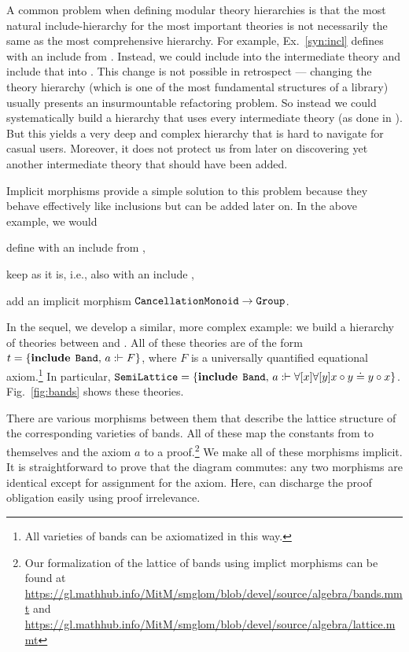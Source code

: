 A common problem when defining modular theory hierarchies is that the most natural include-hierarchy for the most important theories is not necessarily the same as the most comprehensive hierarchy.
For example, Ex.~\ref{syn:incl} defines  with an include from .
Instead, we could include  into the intermediate theory  and include that into .
This change is not possible in retrospect --- changing the theory hierarchy (which is one of the most fundamental structures of a library) usually presents an insurmountable refactoring problem.
So instead we could systematically build a hierarchy that uses every intermediate theory (as done in \cite{mathscheme}).
But this yields a very deep and complex hierarchy that is hard to navigate for casual users.
Moreover, it does not protect us from later on discovering yet another intermediate theory that should have been added.

Implicit morphisms provide a simple solution to this problem because they behave effectively like inclusions but can be added later on.
In the above example, we would
\begin{compactitem}
 \item define  with an include from ,
 \item keep  as it is, i.e., also with an include ,
 \item add an implicit morphism $\operatorname{\mathtt{CancellationMonoid}}\to\operatorname{\mathtt{Group}}$.
\end{compactitem}

In the sequel, we develop a similar, more complex example: we build a hierarchy of theories between  and .
All of these theories are of the form $t=\{\operatorname{\mathbf{include}}{\;\operatorname{\mathtt{Band}}},\,a:\vdash F\}$, where $F$ is a universally quantified equational axiom.\footnote{All varieties of bands can be axiomatized in this way.}
In particular, $\operatorname{\mathtt{SemiLattice}}=\{\operatorname{\mathbf{include}}{\;\operatorname{\mathtt{Band}}},\,a:\vdash \forall [x]\forall [y] x\circ y\doteq y\circ x\}$.
Fig.~\ref{fig:bands} shows these theories.

There are various morphisms between them that describe the lattice structure of the corresponding varieties of bands.
All of these map the constants from  to themselves and the axiom $a$ to a proof.\footnote{Our formalization of the lattice of bands using implict morphisms can be found at \url{https://gl.mathhub.info/MitM/smglom/blob/devel/source/algebra/bands.mmt} and \url{https://gl.mathhub.info/MitM/smglom/blob/devel/source/algebra/lattice.mmt}}
We make all of these morphisms implicit.
It is straightforward to prove that the diagram commutes: any two morphisms are identical except for assignment for the axiom.
Here, \mmt can discharge the proof obligation easily using proof irrelevance.

